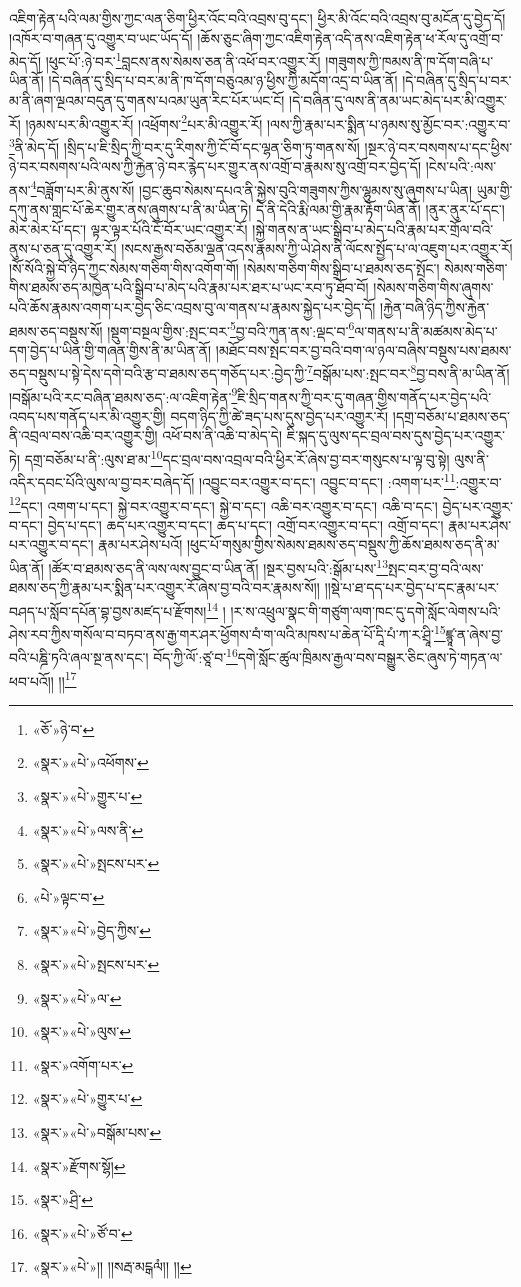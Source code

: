 འཇིག་རྟེན་པའི་ལམ་གྱིས་ཀྱང་ལན་ཅིག་ཕྱིར་འོང་བའི་འབྲས་བུ་དང་། ཕྱིར་མི་འོང་བའི་འབྲས་བུ་མངོན་དུ་བྱེད་དོ། །འཁོར་བ་གཞན་དུ་འགྱུར་བ་ཡང་ཡོད་དོ། །ཆོས་ཅུང་ཞིག་ཀྱང་འཇིག་རྟེན་འདི་ནས་འཇིག་རྟེན་ཕ་རོལ་དུ་འགྲོ་བ་མེད་དོ། །ཕུང་པོ་:ཉེ་བར་\footnote{«ཅོ་»ཉེ་བ་}བླངས་ནས་སེམས་ཅན་ནི་འཕོ་བར་འགྱུར་རོ། །གཟུགས་ཀྱི་ཁམས་ནི་ཁ་དོག་བཞི་པ་ཡིན་ནོ། །དེ་བཞིན་དུ་སྲིད་པ་བར་མ་ནི་ཁ་དོག་བཅུའམ་ཉ་ཕྱིས་ཀྱི་མདོག་འདྲ་བ་ཡིན་ནོ། །དེ་བཞིན་དུ་སྲིད་པ་བར་མ་ནི་ཞག་ལྔའམ་བདུན་དུ་གནས་པའམ་ཡུན་རིང་པོར་ཡང་ངོ། །དེ་བཞིན་དུ་ལས་ནི་ནམ་ཡང་མེད་པར་མི་འགྱུར་རོ། །ཉམས་པར་མི་འགྱུར་རོ། །འཕྲོགས་\footnote{«སྣར་»«པེ་»འཕོགས་}པར་མི་འགྱུར་རོ། །ལས་ཀྱི་རྣམ་པར་སྨིན་པ་ཉམས་སུ་མྱོང་བར་:འགྱུར་བ་\footnote{«སྣར་»«པེ་»གྱུར་པ་}ནི་མེད་དོ། །སྲིད་པ་ཇི་སྲིད་ཀྱི་བར་དུ་རིགས་ཀྱི་ངོ་བོ་དང་ལྷན་ཅིག་ཏུ་གནས་སོ། །སྔར་ཉེ་བར་བསགས་པ་དང་ཕྱིས་ཉེ་བར་བསགས་པའི་ལས་ཀྱི་རྐྱེན་ཉེ་བར་རྙེད་པར་གྱུར་ནས་འགྲོ་བ་རྣམས་སུ་འགྲོ་བར་བྱེད་དོ། །ངེས་པའི་:ལས་ནས་\footnote{«སྣར་»«པེ་»ལས་ནི་}བཟློག་པར་མི་ནུས་སོ། །བྱང་ཆུབ་སེམས་དཔའ་ནི་སྐྱེས་བུའི་གཟུགས་ཀྱིས་ལྷུམས་སུ་ཞུགས་པ་ཡིན། ཡུམ་གྱི་དཀུ་ནས་གླང་པོ་ཆེར་གྱུར་ནས་ཞུགས་པ་ནི་མ་ཡིན་ཏེ། དེ་ནི་དེའི་རྨི་ལམ་གྱི་རྣམ་རྟོག་ཡིན་ནོ། །ནུར་ནུར་པོ་དང་། མེར་མེར་པོ་དང་། ལྟར་ལྟར་པོའི་ངོ་བོར་ཡང་འགྱུར་རོ། །སྐྱེ་གནས་ན་ཡང་སྒྲིབ་པ་མེད་པའི་རྣམ་པར་གྲོལ་བའི་ནུས་པ་ཅན་དུ་འགྱུར་རོ། །སངས་རྒྱས་བཅོམ་ལྡན་འདས་རྣམས་ཀྱི་ཡེ་ཤེས་ནི་ལོངས་སྤྱོད་པ་ལ་འཇུག་པར་འགྱུར་རོ། །སོ་སོའི་སྐྱེ་བོ་ཉིད་ཀྱང་སེམས་གཅིག་གིས་འགོག་གོ། །སེམས་གཅིག་གིས་སྒྲིབ་པ་ཐམས་ཅད་སྤོང་། སེམས་གཅིག་གིས་ཐམས་ཅད་མཁྱེན་པའི་སྒྲིབ་པ་མེད་པའི་རྣམ་པར་ཐར་པ་ཡང་རབ་ཏུ་ཐོབ་བོ། །སེམས་གཅིག་གིས་ཞུགས་པའི་ཆོས་རྣམས་འགག་པར་བྱེད་ཅིང་འབྲས་བུ་ལ་གནས་པ་རྣམས་སྐྱེད་པར་བྱེད་དོ། །རྐྱེན་བཞི་ཉིད་ཀྱིས་རྐྱེན་ཐམས་ཅད་བསྡུས་སོ། །སྡུག་བསྔལ་གྱིས་:སྤང་བར་\footnote{«སྣར་»«པེ་»སྤངས་པར་}བྱ་བའི་ཀུན་ནས་:ལྡང་བ་\footnote{«པེ་»ལྟང་བ་}ལ་གནས་པ་ནི་མཚམས་མེད་པ་དག་བྱེད་པ་ཡིན་གྱི་གཞན་གྱིས་ནི་མ་ཡིན་ནོ། །མཐོང་བས་སྤང་བར་བྱ་བའི་བག་ལ་ཉལ་བཞིས་བསྡུས་པས་ཐམས་ཅད་བསྡུས་པ་སྟེ་དེས་དགེ་བའི་རྩ་བ་ཐམས་ཅད་གཅོད་པར་:བྱེད་ཀྱི་\footnote{«སྣར་»«པེ་»བྱེད་ཀྱིས་}བསྒོམ་པས་:སྤང་བར་\footnote{«སྣར་»«པེ་»སྤངས་པར་}བྱ་བས་ནི་མ་ཡིན་ནོ། །བསྒོམ་པའི་རང་བཞིན་ཐམས་ཅད་:ལ་འཇིག་རྟེན་\footnote{«སྣར་»«པེ་»ལ་}ཇི་སྲིད་གནས་ཀྱི་བར་དུ་གཞན་གྱིས་གནོད་པར་བྱེད་པའི་འབད་པས་གནོད་པར་མི་འགྱུར་གྱི། བདག་ཉིད་ཀྱི་ཚེ་ཟད་པས་དུས་བྱེད་པར་འགྱུར་རོ། །དགྲ་བཅོམ་པ་ཐམས་ཅད་ནི་འབྲལ་བས་འཆི་བར་འགྱུར་གྱི། འཕོ་བས་ནི་འཆི་བ་མེད་དེ། ཇི་སྐད་དུ་ལུས་དང་བྲལ་བས་དུས་བྱེད་པར་འགྱུར་ཏེ། དགྲ་བཅོམ་པ་ནི་:ལུས་ཐ་མ་\footnote{«སྣར་»«པེ་»ལུས་}དང་བྲལ་བས་འབྲལ་བའི་ཕྱིར་རོ་ཞེས་བྱ་བར་གསུངས་པ་ལྟ་བུ་སྟེ། ལུས་ནི་འདིར་དབང་པོའི་ལུས་ལ་བྱ་བར་བཞེད་དོ། །འབྱུང་བར་འགྱུར་བ་དང་། འབྱུང་བ་དང་། :འགག་པར་\footnote{«སྣར་»འགོག་པར་}:འགྱུར་བ་\footnote{«སྣར་»«པེ་»གྱུར་པ་}དང་། འགག་པ་དང་། སྐྱེ་བར་འགྱུར་བ་དང་། སྐྱེ་བ་དང་། འཆི་བར་འགྱུར་བ་དང་། འཆི་བ་དང་། བྱེད་པར་འགྱུར་བ་དང་། བྱེད་པ་དང་། ཆད་པར་འགྱུར་བ་དང་། ཆད་པ་དང་། འགྲོ་བར་འགྱུར་བ་དང་། འགྲོ་བ་དང་། རྣམ་པར་ཤེས་པར་འགྱུར་བ་དང་། རྣམ་པར་ཤེས་པའོ། །ཕུང་པོ་གསུམ་གྱིས་སེམས་ཐམས་ཅད་བསྡུས་ཀྱི་ཆོས་ཐམས་ཅད་ནི་མ་ཡིན་ནོ། །ཚོར་བ་ཐམས་ཅད་ནི་ལས་ལས་བྱུང་བ་ཡིན་ནོ། །སྔར་བྱས་པའི་:སྒོམ་པས་\footnote{«སྣར་»«པེ་»བསྒོམ་པས་}སྤང་བར་བྱ་བའི་ལས་ཐམས་ཅད་ཀྱི་རྣམ་པར་སྨིན་པར་འགྱུར་རོ་ཞེས་བྱ་བའི་བར་རྣམས་སོ།། །།སྡེ་པ་ཐ་དད་པར་བྱེད་པ་དང་རྣམ་པར་བཤད་པ་སློབ་དཔོན་བྷ་བྱས་མཛད་པ་རྫོགས།\footnote{«སྣར་»རྫོགས་སྷོ།} ། །ར་ས་འཕྲུལ་སྣང་གི་གཙུག་ལག་ཁང་དུ་དགེ་སློང་ལེགས་པའི་ཤེས་རབ་ཀྱིས་གསོལ་བ་བཏབ་ནས་རྒྱ་གར་ཤར་ཕྱོགས་བཾ་ག་ལའི་མཁས་པ་ཆེན་པོ་དཱི་པཾ་ཀ་ར་ཤྲཱི་\footnote{«སྣར་»ཤྲི་}ཛྙཱ་ན་ཞེས་བྱ་བའི་པཎྜི་ཏའི་ཞལ་སྔ་ནས་དང་། བོད་ཀྱི་ལོ་:ཙཱ་བ་\footnote{«སྣར་»«པེ་»ཙོ་བ་}དགེ་སློང་ཚུལ་ཁྲིམས་རྒྱལ་བས་བསྒྱུར་ཅིང་ཞུས་ཏེ་གཏན་ལ་ཕབ་པའོ།། །།\footnote{«སྣར་»«པེ་»།། །།སརྦ་མངྒལཾ།། །།}